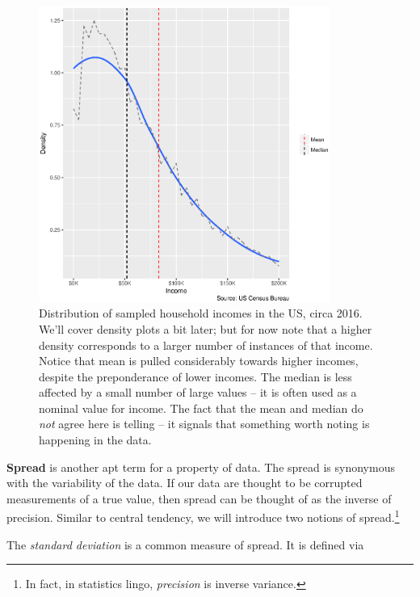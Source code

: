 \documentclass[../primer.tex]{subfiles}
\begin{document}
\begin{figure}[!ht]
  \centering
  \includegraphics[width=0.85\textwidth]{./images/income}

  \caption{Distribution of sampled household incomes in the US, circa 2016.
    We'll cover density plots a bit later; but for now note that a higher
    density corresponds to a larger number of instances of that income. Notice
    that mean is pulled considerably towards higher incomes, despite the
    preponderance of lower incomes. The median is less affected by a small
    number of large values -- it is often used as a nominal value for income.
    The fact that the mean and median do \emph{not} agree here is telling -- it
    signals that something worth noting is happening in the data.}
  \label{fig:income-median}
\end{figure}


\textbf{Spread} is another apt term for a property of data. The spread is
synonymous with the variability of the data. If our data are thought to be
corrupted measurements of a true value, then spread can be thought of as the
inverse of precision. Similar to central tendency, we will introduce two notions
of spread.\footnote{In fact, in statistics lingo, \emph{precision} is inverse
  variance.}

The \emph{standard deviation} is a common measure of spread. It is defined via
\end{document}

